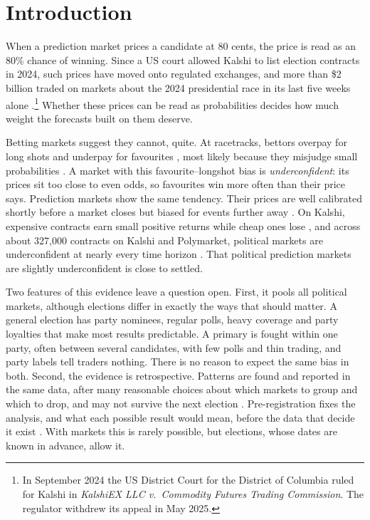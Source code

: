 \section{Introduction}\label{sec:introduction}

When a prediction market prices a candidate at 80 cents, the price is read as an 80\% chance of winning. Since a US
court allowed Kalshi to list election contracts in 2024, such prices have moved onto regulated exchanges, and more than
\$2 billion traded on markets about the 2024 presidential race in its last five weeks alone
\citep{clinton2025}.\footnote{In September 2024 the US District Court for the District of Columbia ruled for Kalshi in
\emph{KalshiEX LLC v.\ Commodity Futures Trading Commission}. The regulator withdrew its appeal in May 2025.} Whether
these prices can be read as probabilities decides how much weight the forecasts built on them deserve.

Betting markets suggest they cannot, quite. At racetracks, bettors overpay for long shots and underpay for favourites
\citep{griffith1949,thaler1988}, most likely because they misjudge small probabilities \citep{snowberg2010}. A market
with this favourite--longshot bias is \emph{underconfident}: its prices sit too close to even odds, so favourites win
more often than their price says. Prediction markets show the same tendency. Their prices are well calibrated shortly
before a market closes but biased for events further away \citep{page2013}. On Kalshi, expensive contracts earn small
positive returns while cheap ones lose \citep{burgi2025}, and across about 327{,}000 contracts on Kalshi and
Polymarket, political markets are underconfident at nearly every time horizon \citep{le2026}. That political prediction
markets are slightly underconfident is close to settled.

Two features of this evidence leave a question open. First, it pools all political markets, although elections differ
in exactly the ways that should matter. A general election has party nominees, regular polls, heavy coverage and party
loyalties that make most results predictable. A primary is fought within one party, often between several candidates,
with few polls and thin trading, and party labels tell traders nothing. There is no reason to expect the same bias in
both. Second, the evidence is retrospective. Patterns are found and reported in the same data, after many reasonable
choices about which markets to group and which to drop, and may not survive the next election \citep{gelman2014}.
Pre-registration fixes the analysis, and what each possible result would mean, before the data that decide it exist
\citep{nosek2018,olken2015}. With markets this is rarely possible, but elections, whose dates are known in advance,
allow it.

